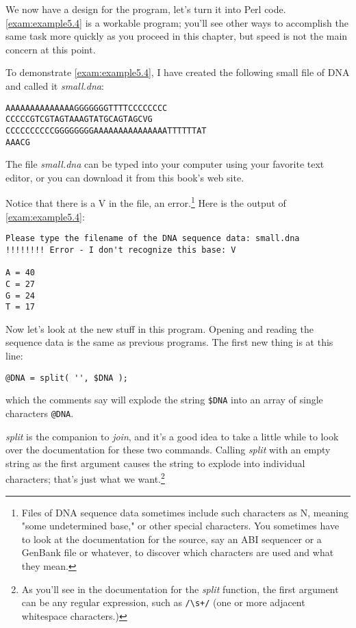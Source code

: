 We now have a design for the program, let's turn it into Perl code. \autoref{exam:example5.4} is a workable program; you'll see other ways to accomplish the same task more quickly as you proceed in this chapter, but speed is not the main concern at this point. 



To demonstrate \autoref{exam:example5.4}, I have created the following small file of DNA and called it \textit{small.dna}: 

\begin{lstlisting}
AAAAAAAAAAAAAAGGGGGGGTTTTCCCCCCCC
CCCCCGTCGTAGTAAAGTATGCAGTAGCVG
CCCCCCCCCCGGGGGGGGAAAAAAAAAAAAAAATTTTTTAT
AAACG
\end{lstlisting}

The file \textit{small.dna} can be typed into your computer using your favorite text editor, or you can download it from this book's web site.

Notice that there is a V in the file, an error.\footnote{Files of DNA sequence data sometimes include such characters as N, meaning "some undetermined base," or other special characters. You sometimes have to look at the documentation for the source, say an ABI sequencer or a GenBank file or whatever, to discover which characters are used and what they mean.} Here is the output of \autoref{exam:example5.4}:

\begin{lstlisting}
Please type the filename of the DNA sequence data: small.dna
!!!!!!!! Error - I don't recognize this base: V

A = 40
C = 27
G = 24
T = 17
\end{lstlisting}

Now let's look at the new stuff in this program. Opening and reading the sequence data is the same as previous programs. The first new thing is at this line:

\begin{lstlisting}
@DNA = split( '', $DNA );
\end{lstlisting}

which the comments say will explode the string \verb|$DNA| into an array of single characters \verb|@DNA|.

\textit{split} is the companion to \textit{join}, and it's a good idea to take a little while to look over the documentation for these two commands. Calling \textit{split} with an empty string as the first argument causes the string to explode into individual characters; that's just what we want.\footnote{As you'll see in the documentation for the \textit{split} function, the first argument can be any regular expression, such as \verb|/\s+/| (one or more adjacent whitespace characters.)}

